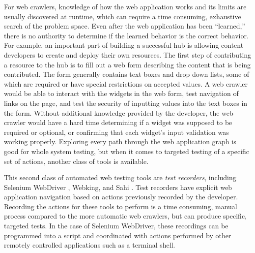 For web crawlers, knowledge of how the web application works and its limits are
usually discovered at runtime, which can require a time consuming, exhaustive
search of the problem space. Even after the web application has been
``learned,'' there is no authority to determine if the learned behavior is the
correct behavior.  For example, an important part of building a successful hub
is allowing content developers to create and deploy their own resources.  The
first step of contributing a resource to the hub is to fill out a web form
describing the content that is being contributed. The form generally contains
text boxes and drop down lists, some of which are required or have special
restrictions on accepted values. A web crawler would be able to interact with
the widgets in the web form, test navigation of links on the page, and test the
security of inputting values into the text boxes in the form.  Without
additional knowledge provided by the developer, the web crawler would have a
hard time determining if a widget was supposed to be required or optional, or
confirming that each widget's input validation was working properly.
%
%
%
Exploring every path through the web application graph is good for whole system
testing, but when it comes to targeted testing of a specific set of actions,
another class of tools is available.



This second class of automated web testing tools are \textit{test recorders},
including Selenium WebDriver \cite{Selenium:AOSA:Online}, Webking, and Sahi
\cite{Sahi:2015:Online}. Test recorders have explicit web application
navigation based on actions previously recorded by the developer. Recording the
actions for these tools to perform is a time consuming, manual process compared
to the more automatic web crawlers, but can produce specific, targeted tests.
In the case of Selenium WebDriver, these recordings can be programmed into a
script and coordinated with actions performed by other remotely controlled
applications such as a terminal shell.

